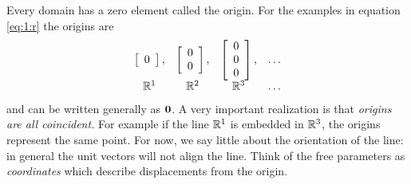 Every domain has a zero element called the origin. For the examples in equation \eqref{eq:1:r} the origins are
\begin{equation}
\begin{array}{cccc}
  \mat{c}{0}, & \mat{c}{0\\0}, & \mat{c}{0\\0\\0}, & \dots \\
  \real{1} & \real{2} & \real{3} & \dots
  \label{eq:1:r}
\end{array}
\end{equation}
and can be written generally as $\zero$. A very important realization is that \textit{origins are all coincident.} For example if the line $\real{1}$ is embedded in $\real{3}$, the origins represent the same point. For now, we say little about the orientation of the line: in general the unit vectors will not align the line. Think of the free parameters as \textit{coordinates} which describe displacements from the origin.
\endinput